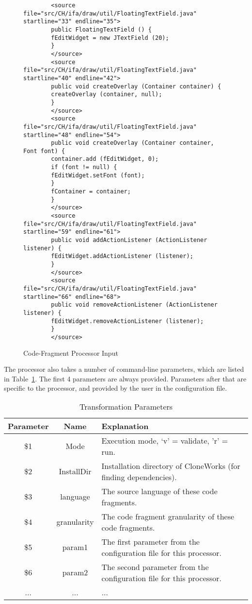 \documentclass[]{article}
\begin{document}
	\begin{figure}
	\caption{Code-Fragment Processor Input} \label{fig:xmlin}
	\begin{verbatim}
		<source file="src/CH/ifa/draw/util/FloatingTextField.java" startline="33" endline="35">
		public FloatingTextField () {
		fEditWidget = new JTextField (20);
		}
		</source>
		<source file="src/CH/ifa/draw/util/FloatingTextField.java" startline="40" endline="42">
		public void createOverlay (Container container) {
		createOverlay (container, null);
		}
		</source>
		<source file="src/CH/ifa/draw/util/FloatingTextField.java" startline="48" endline="54">
		public void createOverlay (Container container, Font font) {
		container.add (fEditWidget, 0);
		if (font != null) {
		fEditWidget.setFont (font);
		}
		fContainer = container;
		}
		</source>
		<source file="src/CH/ifa/draw/util/FloatingTextField.java" startline="59" endline="61">
		public void addActionListener (ActionListener listener) {
		fEditWidget.addActionListener (listener);
		}
		</source>
		<source file="src/CH/ifa/draw/util/FloatingTextField.java" startline="66" endline="68">
		public void removeActionListener (ActionListener listener) {
		fEditWidget.removeActionListener (listener);
		}
		</source>
		\end{verbatim}
	\end{figure}

	The processor also takes a number of command-line parameters, which are listed in Table~\ref{tab:transformparam}.  The first 4 parameters are always provided.  Parameters after that are specific to the processor, and provided by the user in the configuration file.
	
	\begin{table}
	\begin{tabular}{ccl}
		\toprule
		Parameter & Name & Explanation \\
		\midrule
		\$1 & Mode        & Execution mode, `v' = validate, 'r' = run. \\
		\$2 & InstallDir  & Installation directory of CloneWorks (for finding dependencies). \\
		\$3 & language    & The source language of these code fragments. \\
		\$4 & granularity & The code fragment granularity of these code fragments. \\
		\$5 & param1      & The first parameter from the configuration file for this processor. \\
		\$6 & param2      & The second parameter from the configuration file for this processor. \\
		... & ...         & ...\\
		\bottomrule
	\end{tabular}
	\caption{Transformation Parameters} \label{tab:transformparam}
	\end{table}
	
\end{document}
